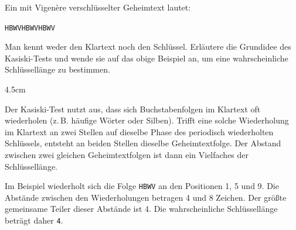 \question[3]
Ein mit Vigenère verschlüsselter Geheimtext lautet:

\texttt{HBWVHBWVHBWV}

Man kennt weder den Klartext noch den Schlüssel. Erläutere die Grundidee 
des Kasiski-Tests und wende sie auf das obige Beispiel an, um eine 
wahrscheinliche Schlüssellänge zu bestimmen.

\begin{solutionbox}{4.5cm}

Der Kasiski-Test nutzt aus, dass sich Buchstabenfolgen im Klartext oft 
wiederholen (z.\,B. häufige Wörter oder Silben). Trifft eine solche 
Wiederholung im Klartext an zwei Stellen auf dieselbe Phase des 
periodisch wiederholten Schlüssels, entsteht an beiden Stellen 
dieselbe Geheimtextfolge. Der Abstand zwischen zwei gleichen 
Geheimtextfolgen ist dann ein Vielfaches der Schlüssellänge.

Im Beispiel wiederholt sich die Folge \texttt{HBWV} an den Positionen 
1, 5 und 9. Die Abstände zwischen den Wiederholungen betragen 4 und 8 
Zeichen. Der größte gemeinsame Teiler dieser Abstände ist 4. Die 
wahrscheinliche Schlüssellänge beträgt daher \texttt{4}.

\end{solutionbox}


